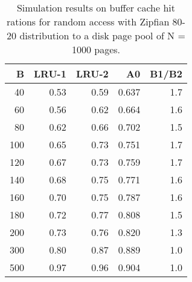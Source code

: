 \begin{table}
\begin{center}
\caption{Simulation results on buffer cache hit rations for random access with Zipfian 80-20 distribution to a disk page pool of N = 1000 pages.}
\begin{tabular}{| r | r | r | r | r | } 
\hline
B & LRU-1 & LRU-2 & A0 & B1/B2 \\ 
\hline
40 & 0.53 & 0.59 & 0.637 & 1.7 \\ 
\hline
60 & 0.56 & 0.62 & 0.664 & 1.6 \\ 
\hline
80 & 0.62 & 0.66 & 0.702 & 1.5 \\ 
\hline
100 & 0.65 & 0.73 & 0.751 & 1.7 \\ 
\hline
120 & 0.67 & 0.73 & 0.759 & 1.7 \\ 
\hline
140 & 0.68 & 0.75 & 0.771 & 1.6 \\ 
\hline
160 & 0.70 & 0.75 & 0.787 & 1.6 \\ 
\hline
180 & 0.72 & 0.77 & 0.808 & 1.5 \\ 
\hline
200 & 0.73 & 0.76 & 0.820 & 1.3 \\ 
\hline
300 & 0.80 & 0.87 & 0.889 & 1.0 \\ 
\hline
500 & 0.97 & 0.96 & 0.904 & 1.0 \\
\hline
\end{tabular}
\end{center}
\end{table}
